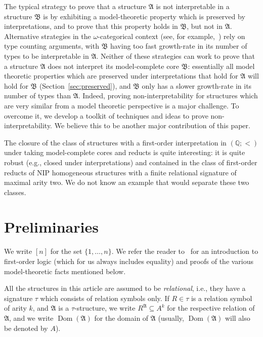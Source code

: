 \documentclass{amsart}
\theoremstyle{definition}
\theoremstyle{remark}
\numberwithin{equation}{section}
\newcommand{\dom}{\operatorname{Dom}}
\newcommand{\fa}{\mathfrak{A}}
\newcommand{\fb}{\mathfrak{B}}
\newcommand{\bA}{\mathfrak{A}}
\begin{document}
The typical strategy to prove that a structure $\fa$ is not interpretable in a structure $\fb$ is by exhibiting a model-theoretic property which is preserved by interpretations, and to prove that this property holds in $\fb$, but not in $\fa$. Alternative strategies in the $\omega$-categorical context (see, for example,~\cite[Theorem A.21]{Walsbergshort}) rely on type counting arguments, with $\fb$ having too fast growth-rate in its number of types to be interpretable in $\fa$. Neither of these strategies can work to prove that a structure $\fa$ does not interpret its model-complete core  $\fb$: essentially all model theoretic properties which are preserved under interpretations that hold for $\fa$ will hold for $\fb$ (Section~\ref{sec:preserved}), and $\fb$ only has a slower growth-rate in its number of types than $\fa$. Indeed, proving non-interpretability for structures which are very similar from a model theoretic perspective is a major challenge. To overcome it, we develop a toolkit of techniques and ideas %
to prove non-interpretability. We believe this to be another major contribution of this paper.


The closure of the class of structures with a first-order interpretation in $({\mathbb Q};<)$ under taking model-complete cores and reducts is quite interesting: 
it is quite robust (e.g., closed under interpretations)  and contained in the class of first-order reducts of NIP homogeneous structures with a finite relational signature of maximal arity two. We do not know an example that would separate these two classes. 

\section{Preliminaries}
\label{sect:prelims}
	We write $[n]$ for the set $\{1,\dots,n\}$. We refer the reader to~\cite{HodgesLong} for 
   an introduction to first-order logic (which for us always includes equality) and
    proofs of the various model-theoretic facts mentioned below.
   
   All the structures in this article are assumed to be \emph{relational}, i.e., they have a signature $\tau$ which consists of relation symbols only. 
    If $R \in \tau$ is a relation symbol of arity $k$, and $\bA$ is a $\tau$-structure, we write $R^{\bA} \subseteq A^k$ for the respective relation of $\bA$, and we write $\dom(\bA)$ for the domain of $\bA$ (usually, $\dom(\bA)$ will also be denoted by $A$).
\end{document}
